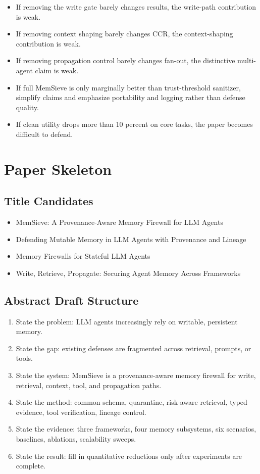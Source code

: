 \documentclass[11pt,oneside]{report}
\newcommand{\project}{MemSieve}
\begin{document}
\begin{itemize}
  \item If removing the write gate barely changes results, the write-path contribution is weak.
  \item If removing context shaping barely changes CCR, the context-shaping contribution is weak.
  \item If removing propagation control barely changes fan-out, the distinctive multi-agent claim is
        weak.
  \item If full \project{} is only marginally better than trust-threshold sanitizer, simplify claims
        and emphasize portability and logging rather than defense quality.
  \item If clean utility drops more than 10 percent on core tasks, the paper becomes difficult to
        defend.
\end{itemize}

\chapter{Paper Skeleton}

\section{Title Candidates}

\begin{itemize}
  \item \project: A Provenance-Aware Memory Firewall for LLM Agents
  \item Defending Mutable Memory in LLM Agents with Provenance and Lineage
  \item Memory Firewalls for Stateful LLM Agents
  \item Write, Retrieve, Propagate: Securing Agent Memory Across Frameworks
\end{itemize}

\section{Abstract Draft Structure}

\begin{enumerate}
  \item State the problem: LLM agents increasingly rely on writable, persistent memory.
  \item State the gap: existing defenses are fragmented across retrieval, prompts, or tools.
  \item State the system: \project{} is a provenance-aware memory firewall for write, retrieval,
        context, tool, and propagation paths.
  \item State the method: common schema, quarantine, risk-aware retrieval, typed evidence, tool
        verification, lineage control.
  \item State the evidence: three frameworks, four memory subsystems, six scenarios, baselines,
        ablations, scalability sweeps.
  \item State the result: fill in quantitative reductions only after experiments are complete.
\end{enumerate}
\end{document}
